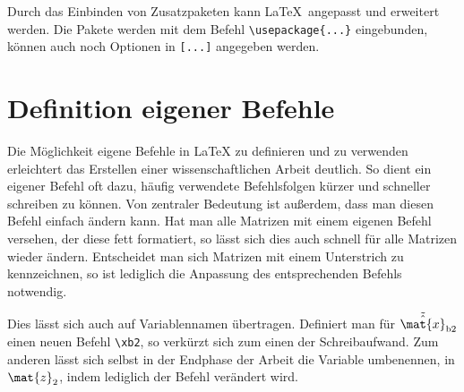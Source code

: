 Durch das Einbinden von Zusatzpaketen kann \LaTeX\ angepasst und erweitert werden.
Die Pakete werden mit dem Befehl \verb|\usepackage{...}| eingebunden, \ggf können auch noch Optionen in \verb|[...]| angegeben werden.


\section{Definition eigener Befehle}

Die Möglichkeit eigene Befehle in \LaTeX{} zu definieren und zu verwenden erleichtert das Erstellen einer wissenschaftlichen Arbeit deutlich.
So dient ein eigener Befehl oft dazu, häufig verwendete Befehlsfolgen kürzer und schneller schreiben zu können.
Von zentraler Bedeutung ist außerdem, dass man diesen Befehl einfach ändern kann.
Hat man \zB alle Matrizen mit einem eigenen Befehl versehen, der diese fett formatiert, so lässt sich dies auch schnell für alle Matrizen wieder ändern.
Entscheidet man sich Matrizen mit einem Unterstrich zu kennzeichnen, so ist lediglich die Anpassung des entsprechenden Befehls notwendig.

Dies lässt sich auch auf Variablennamen übertragen.
Definiert man \zB für $\tilde{\hat{\mat{x}}}_\mathrm{b2}$ einen neuen Befehl \verb|\xb2|, so verkürzt sich zum einen der Schreibaufwand.
Zum anderen lässt sich selbst in der Endphase der Arbeit die Variable umbenennen, \zB in $\mat{z}_2$, indem lediglich der Befehl verändert wird.
